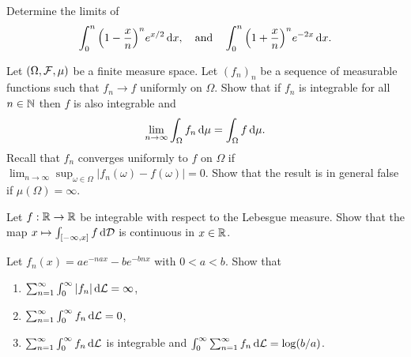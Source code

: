 \begin{problem} Determine the limits of 
    \begin{equation*}
        \int_0^n \Big(1-\frac{x}{n}\Big)^n e^{x/2}\,\mathrm{d} x,\quad\text{and}\quad \int_0^n \Big(1+\frac{x}{n}\Big)^n e^{-2x}\,\mathrm{d} x.
    \end{equation*}
\end{problem}

\begin{problem} Let $(\Omega,\mathcal F,\mu)$ be a finite measure space. Let $(f_n)_n$ be a sequence of measurable functions such that $f_n\to f$ uniformly on $\Omega$. Show that if $f_n$ is integrable for all $n\in\mathbb N$ then $f$ is also integrable and
    \begin{equation*}
        \lim_{n\to\infty} \int_\Omega f_n \,\mathrm{d} \mu = \int_\Omega f \,\mathrm{d} \mu. 
    \end{equation*}
Recall that $f_n$ converges uniformly to $f$ on $\Omega$ if $\lim_{n\to\infty} \sup_{\omega\in \Omega} |f_n(\omega)-f(\omega)| = 0$.
Show that the result is in general false if $\mu(\Omega) = \infty$.
\end{problem}

\begin{problem}
    Let $f:\mathbb R\to \mathbb R$ be integrable with respect to the Lebesgue measure. Show that the map $x\mapsto \int_{[-\infty,x]} f\,\mathrm{d} \mathcal D$ is continuous in $x\in \mathbb R$.
\end{problem}

\begin{problem}
    Let $f_n(x) = a e^{-n a x} - b e^{-b n x}$ with $0<a<b$. Show that
    \begin{enumerate}
        \item $\sum_{n=1}^\infty \int_0^\infty |f_n|\,\mathrm{d} \mathcal L = \infty$,
        \item $\sum_{n=1}^\infty \int_0^\infty f_n\,\mathrm{d} \mathcal L = 0$,
        \item $\sum_{n=1}^\infty \int_0^\infty f_n\,\mathrm{d} \mathcal L$ is integrable and $\int_0^\infty \sum_{n=1}^\infty f_n \,\mathrm{d} \mathcal L = \log(b/a)$.
    \end{enumerate}
\end{problem}
